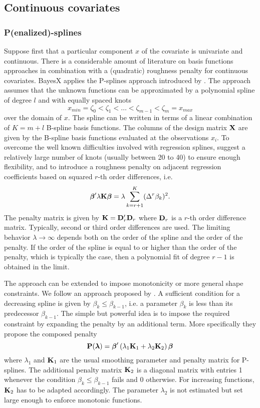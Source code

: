 \documentclass[11pt,a4paper,twoside]{bayesxarticle}
\begin{document}
\subsection{Continuous covariates}
\subsubsection{P(enalized)-splines}
Suppose first that a particular component $x$ of the covariate  is univariate and continuous. There is a considerable amount of
literature on basis functions approaches in combination with a (quadratic) roughness penalty for continuous covariates. BayesX
applies the P-splines approach introduced by . The approach assumes that the unknown functions can be
approximated by a polynomial spline of degree $l$ and with equally spaced knots
$$
x_{min} = \zeta_{0}  < \zeta_{1} < \dots < \zeta_{m-1} < \zeta_{m} = x_{max}
$$
over the domain of $x$. The spline can be written in terms of a linear combination of $K=m+l$ B-spline basis functions. The
columns of the design matrix $\mathbf{X}$ are given by the B-spline basis functions evaluated at the observations $x_i$. To overcome
the well known difficulties involved with regression splines,  suggest a relatively large number of knots
(usually between 20 to 40) to ensure enough flexibility, and to introduce a roughness penalty on adjacent regression
coefficients based on squared $r$-th order differences, i.e.
$$
\boldsymbol{\beta}' \lambda \mathbf{K} \boldsymbol{\beta} = \lambda \sum_{k=r+1}^K (\Delta^r \beta_k)^2.
$$
The penalty matrix is given by $\mathbf{K} =  \mathbf{D}_r' \mathbf{D}_r$ where $\mathbf{D}_r$ is a $r$-th order difference matrix.
Typically, second or third order differences are used. The limiting behavior $\lambda \rightarrow \infty$ depends both on the
order of the spline
and the order of the penalty. If the order of the spline is equal to or
higher than the order of  the penalty, which is typically the case, then a polynomial
fit of degree $r-1$ is obtained in the limit.

The approach can be extended to impose monotonicity or more general shape constraints. We follow an approach proposed by
. A sufficient condition for a decreasing spline is given by $\beta_{k} \leq \beta_{k-1}$, i.e.  a
parameter $\beta_{k}$ is less than its predecessor $\beta_{k-1}$. The simple but powerful idea  is to impose the required
constraint by expanding the penalty by an additional  term. More specifically they propose the composed penalty
$$
\mathbf{P}(\boldsymbol{\lambda}) =  \boldsymbol{\beta}' \left( \lambda_1 \mathbf{K}_1 + \lambda_2 \mathbf{K}_2 \right) \boldsymbol{\beta}
$$
where $\lambda_1$ and $\mathbf{K}_1$ are the usual smoothing parameter
and penalty matrix for P-splines. The additional penalty matrix
$\mathbf{K}_2$ is a diagonal matrix with entries 1 whenever the condition
$\beta_{k} \leq \beta_{k-1}$ fails and 0 otherwise. For increasing
functions, $\mathbf{K}_2$ has to be adapted accordingly. The parameter
$\lambda_2$ is not estimated but set large enough to enforce
monotonic functions.
\end{document}
